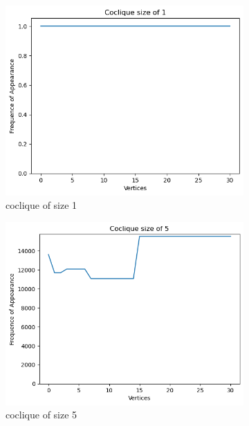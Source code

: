 \documentclass{amsart}
\theoremstyle{definition}
\begin{document}
\begin{appendix}
	\begin{figure}[hbt!]
		\caption*{Depth 5}
		\begin{subfigure}[b]{.45\textwidth}
			\centering
			\includegraphics[width=1\linewidth]{depth_5_size_1.png}
			\caption{coclique of size 1}
		\end{subfigure}
		\begin{subfigure}[b]{.45\textwidth}
			\centering
			\includegraphics[width=1\linewidth]{depth_5_size_5.png}
			\caption{coclique of size 5}
		\end{subfigure}
		\begin{subfigure}[b]{.45\textwidth}
			\centering

\end{subfigure}
\end{figure}
\end{appendix}
\end{document}
